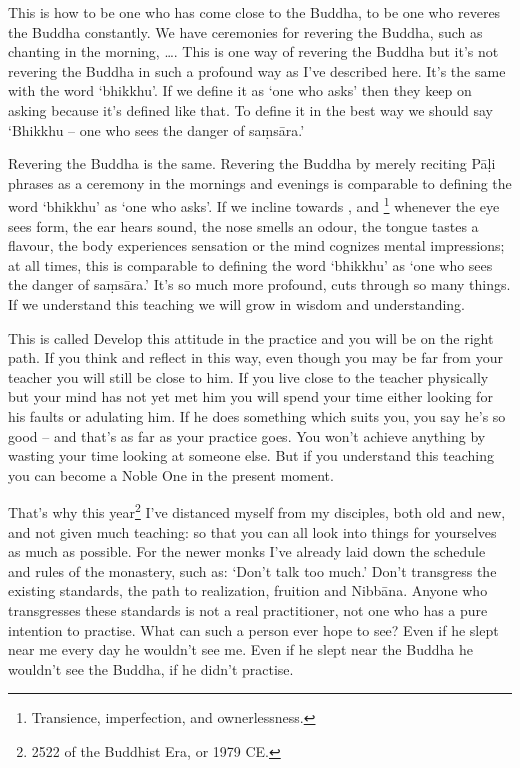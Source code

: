 This is how to be one who has come close to the Buddha, to be one who reveres the Buddha constantly. We have ceremonies for revering the Buddha, such as chanting in the morning,  \ldots{}. This is one way of revering the Buddha but it's not revering the Buddha in such a profound way as I've described here. It's the same with the word `bhikkhu'. If we define it as `one who asks' then they keep  on asking because it's defined like that. To define it in the best way we should say `Bhikkhu -- one who sees the danger of sa\d{m}s\=ara.' 

Revering the Buddha is the same. Revering the Buddha by merely reciting P\=a\d{l}i phrases as a ceremony in the mornings and evenings is comparable to defining the word `bhikkhu' as `one who asks'. If we incline towards ,  and \footnote{Transience, imperfection, and ownerlessness.} whenever the eye sees form, the ear hears sound, the nose smells an odour, the tongue tastes a flavour, the body experiences sensation or the mind cognizes mental impressions; at all times, this is comparable to defining the word `bhikkhu' as `one who sees the danger of sa\d{m}s\=ara.' It's so much more profound, cuts through so many things. If we understand this teaching we will grow in wisdom and understanding. 

This is called  Develop this attitude in the practice and you will be on the right path. If you think and reflect in this way, even though you may be far from your teacher you will still be close to him. If you live close to the teacher physically but your mind has not yet met him you will spend your time either looking for his faults or adulating him. If he does something which suits you, you say he's so good -- and that's as far as your practice goes. You won't achieve anything by wasting your time looking at someone else. But if you understand this teaching you can become a Noble One in the present moment. 

That's why this year\footnote{2522 of the Buddhist Era, or 1979 CE.} I've distanced myself from my disciples, both old and new, and not given much teaching: so that you can all look into things for yourselves as much as possible. For the newer monks I've already laid down the schedule and rules of the monastery, such as: `Don't talk too much.' Don't transgress the existing standards, the path to realization, fruition and Nibb\=ana. Anyone who transgresses these standards is not a real practitioner, not one who has a pure intention to practise. What can such a person ever hope to see? Even if he slept near me every day he wouldn't see me. Even if he slept near the Buddha he wouldn't see the Buddha, if he didn't practise. 

